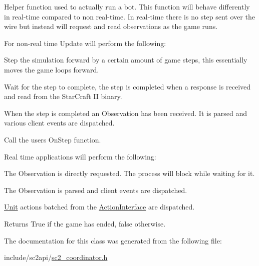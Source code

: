 Helper function used to actually run a bot. This function will behave differently in real-\/time compared to non real-\/time. In real-\/time there is no step sent over the wire but instead will request and read observations as the game runs.
\begin{DoxyItemize}
\item For non-\/real time Update will perform the following\+:
\begin{DoxyEnumerate}
\item Step the simulation forward by a certain amount of game steps, this essentially moves the game loops forward.
\item Wait for the step to complete, the step is completed when a response is received and read from the Star\+Craft II binary.
\begin{DoxyItemize}
\item When the step is completed an Observation has been received. It is parsed and various client events are dispatched.
\end{DoxyItemize}
\item Call the user\textquotesingle{}s On\+Step function.
\end{DoxyEnumerate}
\item Real time applications will perform the following\+:
\begin{DoxyEnumerate}
\item The Observation is directly requested. The process will block while waiting for it.
\item The Observation is parsed and client events are dispatched.
\item \hyperlink{classsc2_1_1_unit}{Unit} actions batched from the \hyperlink{classsc2_1_1_action_interface}{Action\+Interface} are dispatched. \begin{DoxyReturn}{Returns}
True if the game has ended, false otherwise. 
\end{DoxyReturn}

\end{DoxyEnumerate}
\end{DoxyItemize}

The documentation for this class was generated from the following file\+:\begin{DoxyCompactItemize}
\item 
include/sc2api/\hyperlink{sc2__coordinator_8h}{sc2\+\_\+coordinator.\+h}\end{DoxyCompactItemize}
